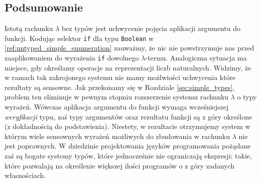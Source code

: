 \subsection{Podsumowanie}
Istotą rachunku \(\lambda\) bez typów jest uchwycenie pojęcia aplikacji argumentu do funkcji. Kodując selektor \texttt{if} dla typu \texttt{Boolean} w \ref{ref:untyped_simple_enumeration} zauważmy, że nic nie powstrzymuje nas przed zaaplikowaniem do wyrażenia \texttt{if} dowolnego \(\lambda\)-termu. Analogiczna sytuacja ma miejsce, gdy określamy operacje na reprezentacji liczb naturalnych. Widzimy, że w ramach tak zakrojonego systemu nie mamy możlwiości uchwycenia które rezultaty są sensowne. Jak przekonamy się w Rozdziale \ref{sec:simple_types}, problem ten eliminuje w pewnym stopniu rozszerzenie systemu rachunku \(\lambda\) o typy wyrażeń. Wówczas aplikacja argumentu do funkcji wymaga wcześniejszej \emph{weryfikacji} typu, zaś typy argumentów oraz rezultatu funkcji są z góry określone (z dokładnością do podstawienia). Niestety, w rezultacie otrzymujemy system w którym wiele sensownych wyrażeń możliwych do zbudowania w rachunku \(\lambda\) nie jest poprawnych. W dziedzinie projektowania języków programowania pożądane zaś są bogate systemy typów, które jednocześnie nie ograniczają ekspresji: takie, które pozwalają na określenie większej ilości programów o z góry zadanych własnościach.
